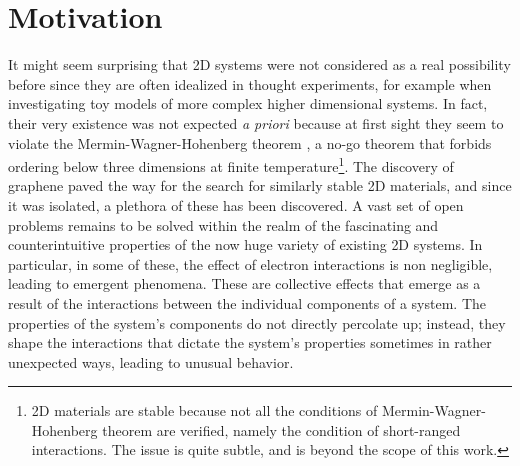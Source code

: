 \section{Motivation}
\label{sec:motivation}

It might seem surprising that \ac{2D} systems were not considered as a real possibility before since they are often idealized in thought experiments, for example when investigating toy models of more complex higher dimensional systems.
In fact, their very existence was not expected \emph{a priori} because at first sight they seem to violate the Mermin-Wagner-Hohenberg theorem \cite{mermin_absence_1966, coleman_there_1973, hohenberg_existence_1967}, a no-go theorem that forbids ordering below three dimensions at finite temperature\footnote{\ac{2D} materials are stable because not all the conditions of Mermin-Wagner-Hohenberg theorem are verified, namely the condition of short-ranged interactions. The issue is quite subtle, and is beyond the scope of this work.}.
The discovery of graphene paved the way for the search for similarly stable \ac{2D} materials, and since it was isolated, a plethora of these has been discovered.
A vast set of open problems remains to be solved within the realm of the fascinating and counterintuitive properties of the now huge variety of existing \ac{2D} systems.
In particular, in some of these, the effect of electron interactions is non negligible, leading to emergent phenomena.
These are collective effects that emerge as a result of the interactions between the individual components of a system.
The properties of the system's components do not directly percolate up; instead, they shape the interactions that dictate the system's properties sometimes in rather unexpected ways, leading to unusual behavior.

